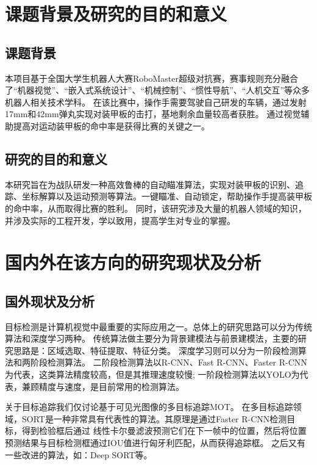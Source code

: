 \section{课题背景及研究的目的和意义}
\subsection{课题背景}
本项目基于全国大学生机器人大赛RoboMaster超级对抗赛，赛事规则充分融合了“机器视觉”、“嵌入式系统设计”、“机械控制”、“惯性导航”、“人机交互”等众多机器人相关技术学科。
在该比赛中，操作手需要驾驶自己研发的车辆，通过发射17mm和42mm弹丸实现对装甲板的击打，基地剩余血量较高者获胜。
通过视觉辅助提高对运动装甲板的命中率是获得比赛的关键之一。

\subsection{研究的目的和意义}
本研究旨在为战队研发一种高效鲁棒的自动瞄准算法，实现对装甲板的识别、追踪、坐标解算以及运动预测等算法。一键瞄准、自动锁定，帮助操作手提高装甲板的命中率，从而取得比赛的胜利。
同时，该研究涉及大量的机器人领域的知识，并涉及实际的工程开发，学以致用，提高学生对专业的掌握。
\section{国内外在该方向的研究现状及分析}
\subsection{国外现状及分析}
目标检测是计算机视觉中最重要的实际应用之一。总体上的研究思路可以分为传统算法和深度学习两种。
传统算法做主要分为背景建模法与前景建模法，主要的研究思路是：区域选取、特征提取、特征分类。
深度学习则可以分为一阶段检测算法和两阶段检测算法。
二阶段检测算法以R-CNN\cite{Girshick_2014_CVPR}、Fast R-CNN\cite{Girshick_2015_ICCV}、Faster R-CNN\cite{NIPS2015_14bfa6bb}为代表，这类算法精度较高，但是其推理速度较慢;
一阶段检测算法以YOLO\cite{redmon2016you}为代表，兼顾精度与速度，是目前常用的检测算法。 \par

关于目标追踪我们仅讨论基于可见光图像的多目标追踪MOT\cite{gomes2008overview}。
在多目标追踪领域，SORT\cite{bewley2016simple}是一种非常具有代表性的算法。其原理是通过Faster R-CNN检测目标，得到检验框后通过
线性卡尔曼滤波预测它们在下一帧中的位置，然后将位置预测结果与目标检测框通过IOU值进行匈牙利匹配，从而获得追踪框。
之后又有一些改进的算法，如：Deep SORT\cite{wojke2017simple}等。

